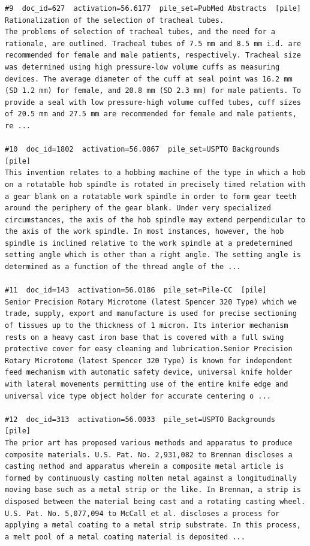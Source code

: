\begin{verbatim}
#9  doc_id=627  activation=56.6177  pile_set=PubMed Abstracts  [pile]
Rationalization of the selection of tracheal tubes.
The problems of selection of tracheal tubes, and the need for a rationale, are outlined. Tracheal tubes of 7.5 mm and 8.5 mm i.d. are recommended for female and male patients, respectively. Tracheal size was determined using high pressure-low volume cuffs as measuring devices. The average diameter of the cuff at seal point was 16.2 mm (SD 1.2 mm) for female, and 20.8 mm (SD 2.3 mm) for male patients. To provide a seal with low pressure-high volume cuffed tubes, cuff sizes of 20.5 mm and 27.5 mm are recommended for female and male patients, re ...

#10  doc_id=1802  activation=56.0867  pile_set=USPTO Backgrounds  [pile]
This invention relates to a hobbing machine of the type in which a hob on a rotatable hob spindle is rotated in precisely timed relation with a gear blank on a rotatable work spindle in order to form gear teeth around the periphery of the gear blank. Under very specialized circumstances, the axis of the hob spindle may extend perpendicular to the axis of the work spindle. In most instances, however, the hob spindle is inclined relative to the work spindle at a predetermined setting angle which is other than a right angle. The setting angle is determined as a function of the thread angle of the ...

#11  doc_id=143  activation=56.0186  pile_set=Pile-CC  [pile]
Senior Precision Rotary Microtome (latest Spencer 320 Type) which we trade, supply, export and manufacture is used for precise sectioning of tissues up to the thickness of 1 micron. Its interior mechanism rests on a heavy cast iron base that is covered with a full swing protective cover for easy cleaning and lubrication.Senior Precision Rotary Microtome (latest Spencer 320 Type) is known for independent feed mechanism with automatic safety device, universal knife holder with lateral movements permitting use of the entire knife edge and universal vice type object holder for accurate centering o ...

#12  doc_id=313  activation=56.0033  pile_set=USPTO Backgrounds  [pile]
The prior art has proposed various methods and apparatus to produce composite materials. U.S. Pat. No. 2,931,082 to Brennan discloses a casting method and apparatus wherein a composite metal article is formed by continuously casting molten metal against a longitudinally moving base such as a metal strip or the like. In Brennan, a strip is disposed between the material being cast and a rotating casting wheel.
U.S. Pat. No. 5,077,094 to McCall et al. discloses a process for applying a metal coating to a metal strip substrate. In this process, a melt pool of a metal coating material is deposited ...


\end{verbatim}
